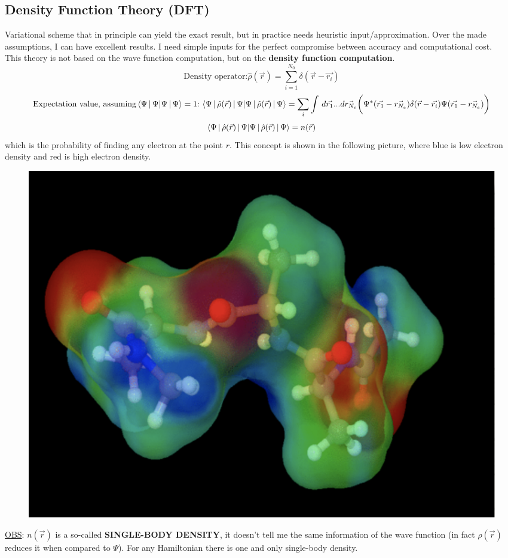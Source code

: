 \subsection{Density Function Theory (DFT)}
Variational scheme that in principle can yield the exact result,  but in practice needs heuristic input/approximation. Over the made assumptions, I can have excellent results. I need simple inputs for the perfect compromise between accuracy and computational cost.\\
This theory is not based on the wave function computation, but on the \textbf{density function computation}.\\
\[
 \text{Density operator:}\hat{\rho}(\vec{r})=\sum_{i=1}^{N_0}\delta(\vec{r}-\vec{r_i})\]
 \[
\text{Expectation value, assuming} \braket{\Psi\,|\,\Psi}=1 \text{:}\, \braket{\Psi\,|\,\hat{\rho}(\vec{r})\,|\,\Psi}=\sum_i \int\,d\vec{r_1}...d\vec{r_{N_e}}\bigg(\Psi^*(\vec{r_1}-\vec{r_{N_e}})\delta(\vec{r}-\vec{r_i})\Psi(\vec{r_1}-\vec{r_{N_e}})\bigg)
\]
\[
\braket{\Psi\,|\,\hat{\rho}(\vec{r})\,|\,\Psi}=n(\vec{r})
\]
which is the probability of finding any electron at the point $r$. This concept is shown in the following picture,  where blue is low electron density and red is high electron density.\\
\begin{figure}[htbp!]
	\centering
	\includegraphics[scale=0.30]{img_14}
\end{figure}
\newline
\ul{OBS}: $n(\vec{r})$ is a so-called \textbf{SINGLE-BODY DENSITY}, it doesn't tell me the same information of the wave function (in fact $\hat{\rho}(\vec{r})$ reduces it when compared to $\Psi$). For any Hamiltonian there is one and only single-body density.\\


